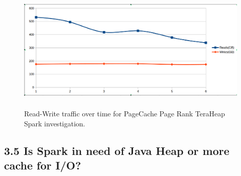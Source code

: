 \documentclass[twocolumn,10pt]{asme2e}
\begin{document}
\begin{figure}[ht]
        \includegraphics[width=12cm,height=6cm]{rw_pr_pc_th.png}
	\caption{Read-Write traffic over time for PageCache Page Rank TeraHeap Spark investigation.}
	\label{fig:rw_pr_pc_th}
\end{figure}
\fi
\subsection*{3.5 Is Spark in need of Java Heap or more cache for I/O?}
\end{document}
